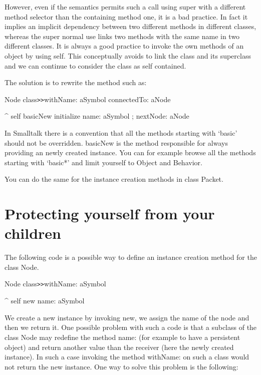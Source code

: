 However, even if the semantics permits such a call using super 
with a different method selector than the containing method one, 
it is a bad practice. In fact it implies an implicit dependency 
between two different methods in different classes, whereas the 
super normal use links two methods with the same name in two 
different classes. It is always a good practice to invoke the 
own methods of an object by using self. This conceptually avoids 
to link the class and its superclass and we can continue to consider 
the class as self contained.

The solution is to rewrite the method such as:

\begin{code}
Node class\texttt{>>}withName: aSymbol connectedTo: aNode

 ^  self basicNew initialize name: aSymbol ; nextNode: aNode
\end{code}

In Smalltalk there is a convention that all the methods starting 
with `basic' should not be overridden. basicNew is the method 
responsible for always providing an newly created instance. You 
can for example browse all the methods starting with `basic*' 
and limit yourself to Object and Behavior.

You can do the same for the instance creation methods in class Packet.



\section{Protecting yourself from your children}


The following code is a possible way to define an instance creation 
method for the class Node.

\begin{code}
Node class\texttt{>>}withName: aSymbol

 ^ self new name: aSymbol 
\end{code}

We create a new instance by invoking new, we assign the name 
of the node and then we return it. One possible problem with 
such a code is that a subclass of the class Node may redefine 
the method name: (for example to have a persistent object) and 
return another value than the receiver (here the newly created 
instance). In such a case invoking the method withName: on such 
a class would not return the new instance. One way to solve this 
problem is the following:


